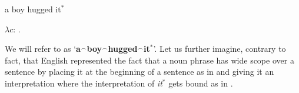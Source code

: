 \begin{ex} 
\begin{subex} 
 
\item a boy hugged it$^*$
 
\item %
  $\lambda c$: . \\
  \hspace*{1em}
 
\end{subex} 
 \label{ex:it-star}  
\end{ex}
We will refer to  as
`\textbf{a}$^\frown$\textbf{boy}$^\frown$\textbf{hugged}$^\frown$\textbf{it$^*$}'.
Let
us further imagine, contrary to fact, that English represented the fact
that a noun phrase has wide scope over a sentence by placing it at the
beginning of a sentence as in  and giving it an
interpretation where the interpretation of \textit{it$^*$} gets bound
as in .
